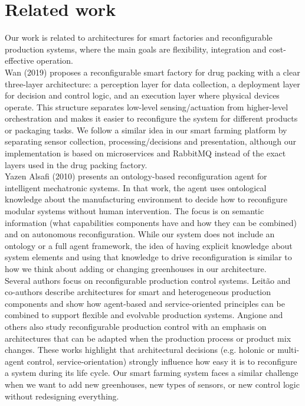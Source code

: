\documentclass[conference]{IEEEtran}
\begin{document}
\section{Related work}
\label{sec:related_work}
Our work is related to architectures for smart factories and reconfigurable production systems, where the main goals are flexibility, integration and cost-effective operation.\\

Wan (2019) proposes a reconfigurable smart factory for drug packing with a clear three-layer architecture: a perception layer for data collection, a deployment layer for decision and control logic, and an execution layer where physical devices operate. This structure separates low-level sensing/actuation from higher-level orchestration and makes it easier to reconfigure the system for different products or packaging tasks. We follow a similar idea in our smart farming platform by separating sensor collection, processing/decisions and presentation, although our implementation is based on microservices and RabbitMQ instead of the exact layers used in the drug packing factory.\\

Yazen Alsafi (2010) presents an ontology-based reconfiguration agent for intelligent mechatronic systems.  In that work, the agent uses ontological knowledge about the manufacturing environment to decide how to reconfigure modular systems without human intervention. The focus is on semantic information (what capabilities components have and how they can be combined) and on autonomous reconfiguration. While our system does not include an ontology or a full agent framework, the idea of having explicit knowledge about system elements and using that knowledge to drive reconfiguration is similar to how we think about adding or changing greenhouses in our architecture.\\

Several authors focus on reconfigurable production control systems. Leitão and co-authors describe architectures for smart and heterogeneous production components and show how agent-based and service-oriented principles can be combined to support flexible and evolvable production systems. Angione and others also study reconfigurable production control with an emphasis on architectures that can be adapted when the production process or product mix changes. These works highlight that architectural decisions (e.g. holonic or multi-agent control, service-orientation) strongly influence how easy it is to reconfigure a system during its life cycle. Our smart farming system faces a similar challenge when we want to add new greenhouses, new types of sensors, or new control logic without redesigning everything.\\
\end{document}

